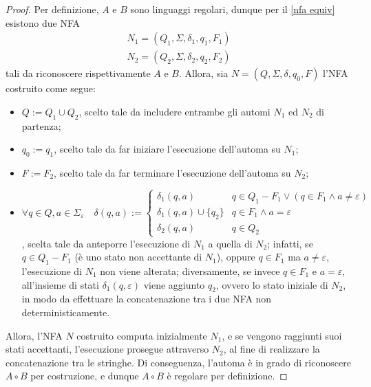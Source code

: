 \documentclass[a4paper, 12pt]{report}
\begin{document}
    \begin{proof}
        Per definizione, $A$ e $B$ sono linguaggi regolari, dunque per il \cref{nfa equiv} esistono due NFA $$\left. \begin{array}{c}N_1 = (Q_1, \Sigma, \delta_1, q_1, F_1) \\ N_2 = (Q_2, \Sigma, \delta_2, q_2, F_2) \end{array} \right.$$ tali da riconoscere rispettivamente $A$ e $B$. Allora, sia $N = (Q, \Sigma, \delta, q_0, F)$ l'NFA costruito come segue:
        
        \begin{itemize}
            \item $Q := Q_1 \cup Q_2$, scelto tale da includere entrambe gli automi $N_1$ ed $N_2$ di partenza;
            \item $q_0 := q_1$, scelto tale da far iniziare l'esecuzione dell'automa su $N_1$;
            \item $F := F_2$, scelto tale da far terminare l'esecuzione dell'automa su $N_2$;
            \item $\forall q \in Q, a \in \Sigma_\varepsilon \quad \delta(q, a) := \left \{ \begin{array}{ll} \delta_1(q, a) & q \in Q_1 - F_1 \lor (q \in F_1 \land a \neq \varepsilon) \\ \delta_1(q, a) \cup \{q_2\} & q \in F_1 \land a = \varepsilon \\ \delta_2(q, a) & q \in Q_2 \end{array} \right.$, scelta tale da anteporre l'esecuzione di $N_1$ a quella di $N_2$; infatti, se $q \in Q_1 - F_1$ (è uno stato non accettante di $N_1$), oppure $q \in F_1$ ma $a \neq \varepsilon$, l'esecuzione di $N_1$ non viene alterata; diversamente, se invece $q \in F_1$ e $a = \varepsilon$, all'insieme di stati $\delta_1(q, \varepsilon)$ viene aggiunto $q_2$, ovvero lo stato iniziale di $N_2$, in modo da effettuare la concatenazione tra i due NFA non deterministicamente.
        \end{itemize}


        Allora, l'NFA $N$ costruito computa inizialmente $N_1$, e se vengono raggiunti suoi stati accettanti, l'esecuzione prosegue attraverso $N_2$, al fine di realizzare la concatenazione tra le stringhe. Di conseguenza, l'automa è in grado di riconoscere $A \circ B$ per costruzione, e dunque $A \circ B$ è regolare per definizione.
    \end{proof}
\end{document}
